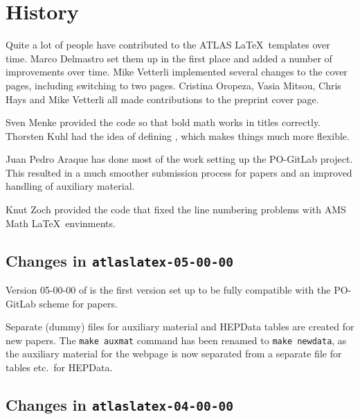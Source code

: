 \section{History}

Quite a lot of people have contributed to the ATLAS \LaTeX\ templates over time.
Marco Delmastro set them up in the first place and added a number of improvements over time.
Mike Vetterli implemented several changes to the cover pages, including switching to two pages.
Cristina Oropeza, Vasia Mitsou, Chris Hays and Mike Vetterli all made contributions to the preprint cover page.

Sven Menke provided the code so that bold math works in titles correctly.
Thorsten Kuhl had the idea of defining , which makes things much more flexible.

Juan Pedro Araque has done most of the work setting up the PO-GitLab project.
This resulted in a much smoother submission process for papers and
an improved handling of auxiliary material.

Knut Zoch provided the code that fixed the line numbering problems with AMS Math \LaTeX\ envinments.


\subsection{Changes in \texttt{atlaslatex-05-00-00}}
\label{sec:atlaslatex5}

Version 05-00-00 of  is the first version set up
to be fully compatible with the PO-GitLab scheme for papers.

Separate (dummy) files for auxiliary material and HEPData tables are created for new papers.
The \verb|make auxmat| command has been renamed to \verb|make newdata|,
as the auxiliary material for the webpage is now separated
from a separate file for tables etc.\ for HEPData.


\subsection{Changes in \texttt{atlaslatex-04-00-00}}
\label{sec:atlaslatex4}

